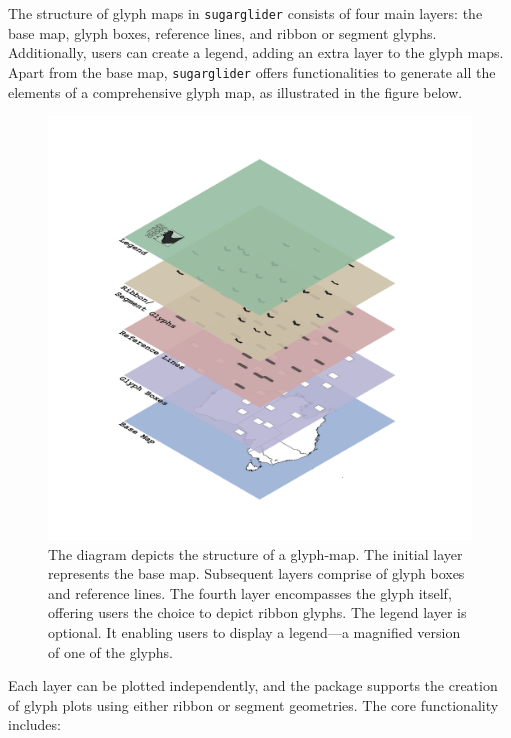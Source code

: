 The structure of glyph maps in \texttt{sugarglider} consists of four main layers: the base map, glyph boxes, reference lines, and ribbon or segment glyphs. Additionally, users can create a legend, adding an extra layer to the glyph maps. Apart from the base map, \texttt{sugarglider} offers functionalities to generate all the elements of a comprehensive glyph map, as illustrated in the figure below.

\begin{figure}
\includegraphics[width=36.11in]{figures/glyphmap-layers} \caption{The diagram depicts the structure of a glyph-map. The initial layer represents the base map. Subsequent layers comprise of glyph boxes and reference lines. The fourth layer encompasses the glyph itself, offering users the choice to depict ribbon glyphs. The legend layer is optional. It enabling users to display a legend—a magnified version of one of the glyphs.}\label{fig:unnamed-chunk-1}
\end{figure}

Each layer can be plotted independently, and the package supports the creation of glyph plots using either ribbon or segment geometries. The core functionality includes:

